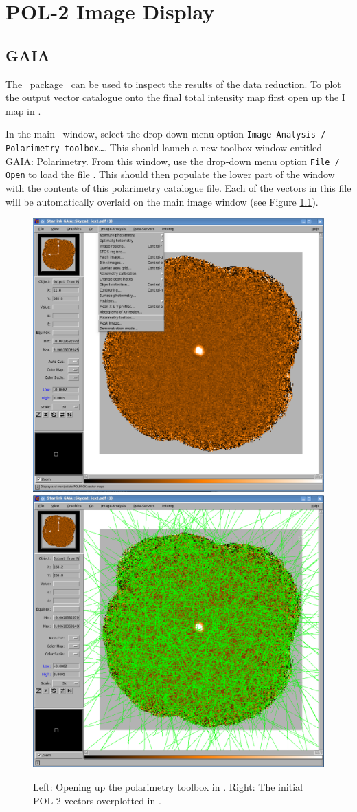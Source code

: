 \chapter{POL-2 Image Display}
\label{sec:display}

\section{GAIA}

The \starlink\ package \gaia\ can be used to inspect the results of
the data reduction.  To plot the output vector catalogue onto the
final total intensity map first open up the I map in \GAIA.

\begin{terminalv}
\end{terminalv}


In the main \GAIA\ window, select the drop-down menu option
\texttt{Image Analysis / Polarimetry toolbox…}. This should launch a
new toolbox window entitled GAIA: Polarimetry. From this window, use
the drop-down menu option \texttt{File / Open} to load the file
. This should then populate the lower part of the window
with the contents of this polarimetry catalogue file.  Each of the vectors
in this file will be automatically overlaid on the main image window
(see Figure \ref{fig:gaiavectorsopen}).

\begin{figure}[t!]
\begin{center}
\includegraphics[width=0.46\linewidth]{sc22-gaia-plot-vectors-1.png}
\includegraphics[width=0.46\linewidth]{sc22-gaia-plot-vectors-3.png}
\caption [Over Plotting Vectors in GAIA]{
  Left: Opening up the polarimetry toolbox in \GAIA. Right: The initial POL-2
  vectors overplotted in \GAIA.
\label{fig:gaiavectorsopen}
}
\end{center}
\end{figure}

